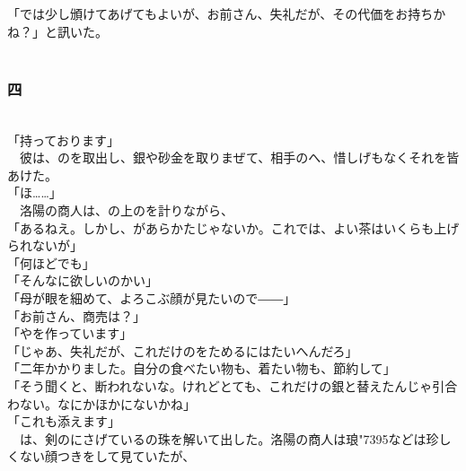 \documentclass[
  paper=a5,
  fontsize=10pt,
  jafontsize=9.5pt,
  tate,                  %
  open_bracket_pos=nibu, %
]{jlreq}
\begin{document}
「では少し頒けてあげてもよいが、お前さん、失礼だが、その代価をお持ちかね？」と訊いた。\\

\\

\subsubsection{四}

\\


「持っております」\\


　彼は、のを取出し、銀や砂金を取りまぜて、相手のへ、惜しげもなくそれを皆あけた。\\


「ほ……」\\


　洛陽の商人は、の上のを計りながら、\\


「あるねえ。しかし、があらかたじゃないか。これでは、よい茶はいくらも上げられないが」\\


「何ほどでも」\\


「そんなに欲しいのかい」\\


「母が眼を細めて、よろこぶ顔が見たいので――」\\


「お前さん、商売は？」\\


「やを作っています」\\


「じゃあ、失礼だが、これだけのをためるにはたいへんだろ」\\


「二年かかりました。自分の食べたい物も、着たい物も、節約して」\\


「そう聞くと、断われないな。けれどとても、これだけの銀と替えたんじゃ引合わない。なにかほかにないかね」\\


「これも添えます」\\


　は、剣のにさげているの珠を解いて出した。洛陽の商人は琅{\char"7395}などは珍しくない顔つきをして見ていたが、\\
\end{document}
